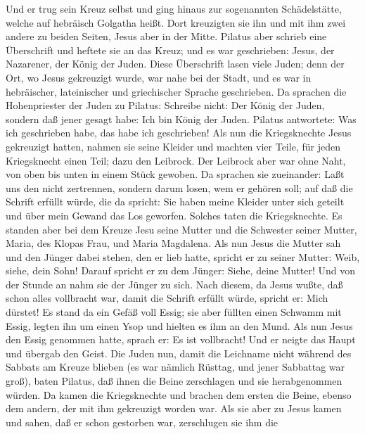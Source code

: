  Und er trug sein Kreuz selbst und ging hinaus zur
sogenannten Schädelstätte, welche auf hebräisch Golgatha heißt.
 Dort kreuzigten sie ihn und mit ihm zwei andere zu
beiden Seiten, Jesus aber in der Mitte.  Pilatus aber
schrieb eine Überschrift und heftete sie an das Kreuz; und es war
geschrieben: Jesus, der Nazarener, der König der Juden. 
Diese Überschrift lasen viele Juden; denn der Ort, wo Jesus gekreuzigt
wurde, war nahe bei der Stadt, und es war in hebräischer, lateinischer
und griechischer Sprache geschrieben.  Da sprachen die
Hohenpriester der Juden zu Pilatus: Schreibe nicht: Der König der Juden,
sondern daß jener gesagt habe: Ich bin König der Juden. 
Pilatus antwortete: Was ich geschrieben habe, das habe ich geschrieben!
 Als nun die Kriegsknechte Jesus gekreuzigt hatten,
nahmen sie seine Kleider und machten vier Teile, für jeden Kriegsknecht
einen Teil; dazu den Leibrock. Der Leibrock aber war ohne Naht, von oben
bis unten in einem Stück gewoben.  Da sprachen sie
zueinander: Laßt uns den nicht zertrennen, sondern darum losen, wem er
gehören soll; auf daß die Schrift erfüllt würde, die da spricht: Sie
haben meine Kleider unter sich geteilt und über mein Gewand das Los
geworfen. Solches taten die Kriegsknechte.  Es standen
aber bei dem Kreuze Jesu seine Mutter und die Schwester seiner Mutter,
Maria, des Klopas Frau, und Maria Magdalena.  Als nun
Jesus die Mutter sah und den Jünger dabei stehen, den er lieb hatte,
spricht er zu seiner Mutter: Weib, siehe, dein Sohn! 
Darauf spricht er zu dem Jünger: Siehe, deine Mutter! Und von der Stunde
an nahm sie der Jünger zu sich.  Nach diesem, da Jesus
wußte, daß schon alles vollbracht war, damit die Schrift erfüllt würde,
spricht er: Mich dürstet!  Es stand da ein Gefäß voll
Essig; sie aber füllten einen Schwamm mit Essig, legten ihn um einen
Ysop und hielten es ihm an den Mund.  Als nun Jesus den
Essig genommen hatte, sprach er: Es ist vollbracht! Und er neigte das
Haupt und übergab den Geist.  Die Juden nun, damit die
Leichname nicht während des Sabbats am Kreuze blieben (es war nämlich
Rüsttag, und jener Sabbattag war groß), baten Pilatus, daß ihnen die
Beine zerschlagen und sie herabgenommen würden.  Da kamen
die Kriegsknechte und brachen dem ersten die Beine, ebenso dem andern,
der mit ihm gekreuzigt worden war.  Als sie aber zu Jesus
kamen und sahen, daß er schon gestorben war, zerschlugen sie ihm die
